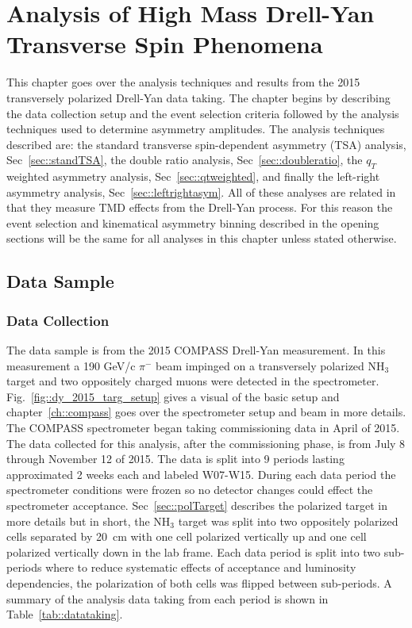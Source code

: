 \chapter{Analysis of High Mass Drell-Yan Transverse Spin Phenomena}
\label{ch::leftright}
\ifpdf
\graphicspath{{Chapters/HMAnalysis/Figs/}}
\fi

This chapter goes over the analysis techniques and results from the 2015
transversely polarized Drell-Yan data taking.  The chapter begins by describing
the data collection setup and the event selection criteria followed by the
analysis techniques used to determine asymmetry amplitudes.  The analysis
techniques described are: the standard transverse spin-dependent asymmetry (TSA)
analysis, Sec~\ref{sec::standTSA}, the double ratio analysis,
Sec~\ref{sec::doubleratio}, the $q_T$ weighted asymmetry analysis,
Sec~\ref{sec::qtweighted}, and finally the left-right asymmetry analysis,
Sec~\ref{sec::leftrightasym}.  All of these analyses are related in that they
measure TMD effects from the Drell-Yan process.  For this reason the event
selection and kinematical asymmetry binning described in the opening sections
will be the same for all analyses in this chapter unless stated otherwise.

\section{Data Sample} \label{sec::datasample}

\subsection{Data Collection} \label{sec::datacollection}

The data sample is from the 2015 COMPASS Drell-Yan measurement.  In this
measurement a 190 GeV/c $\pi^-$ beam impinged on a transversely polarized NH$_3$
target and two oppositely charged muons were detected in the spectrometer.
Fig.~\ref{fig::dy_2015_targ_setup} gives a visual of the basic setup and
chapter~\ref{ch::compass} goes over the spectrometer setup and beam in more
details.  The COMPASS spectrometer began taking commissioning data in April of
2015.  The data collected for this analysis, after the commissioning phase, is
from July 8 through November 12 of 2015.  The data is split into 9 periods
lasting approximated 2 weeks each and labeled W07-W15.  During each data period
the spectrometer conditions were frozen so no detector changes could effect the
spectrometer acceptance.  Sec~\ref{sec::polTarget} describes the polarized
target in more details but in short, the NH$_3$ target was split into two
oppositely polarized cells separated by 20~cm with one cell polarized vertically
up and one cell polarized vertically down in the lab frame.  Each data period is
split into two sub-periods where to reduce systematic effects of acceptance and
luminosity dependencies, the polarization of both cells was flipped between
sub-periods.  A summary of the analysis data taking from each period is shown in
Table~\ref{tab::datataking}.

